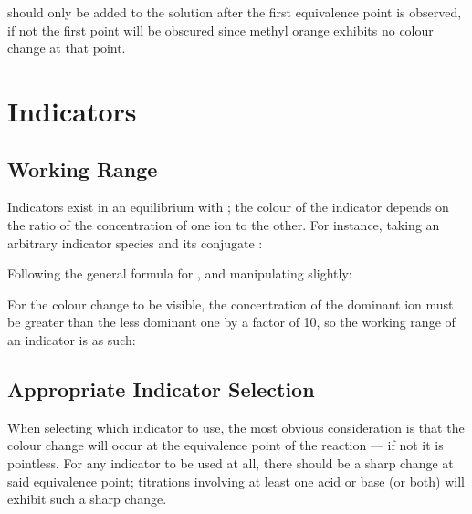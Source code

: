 			 should only be added to the solution after the first equivalence point is observed, if not the first
			point will be obscured since methyl orange exhibits no colour change at that point.










	\section{\texorpdfstring{\pH{}}{pH} Indicators}

		\subsection{Working Range}

			Indicators exist in an equilibrium with ; the colour of the indicator depends on the ratio of the concentration of
			one ion to the other. For instance, taking an arbitrary indicator species  and its conjugate :


			Following the general formula for \Ka{}, and manipulating slightly:

			\mathdiagram{
				\[ \MK{X} = \frac{[\ch{H+}][\ch{X-}]}{[\ch{HX}]} \hspace{12mm}
					\MpH = \MpK{X} + \lg{\frac{[\ch{X-}]}{[\ch{HX}]}} \]
			}

			For the colour change to be visible, the concentration of the dominant ion must be greater than the less dominant one
			by a factor of 10, so the working range of an indicator is as such:

			\mathdiagram{
				\[ \MpH = \MpK{X} \pm 1 \]
			}




		\pagebreak
		\subsection{Appropriate Indicator Selection}

			When selecting which indicator to use, the most obvious consideration is that the colour change will occur at the equivalence
			point of the reaction --- if not it is pointless. For any indicator to be used at all, there should be a sharp change at said
			equivalence point; titrations involving at least one  acid or base (or both) will exhibit such a sharp change.

